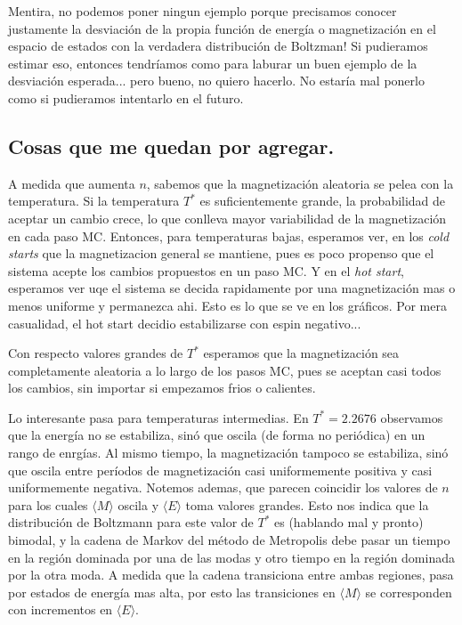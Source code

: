 \documentclass[a4paper,12pt]{article}
\begin{document}
Mentira, no podemos poner ningun ejemplo porque precisamos conocer justamente la desviación de la propia función de energía o magnetización en el espacio de estados con la verdadera distribución de Boltzman! Si pudieramos estimar eso, entonces tendríamos como para laburar un buen ejemplo de la desviación esperada... pero bueno, no quiero hacerlo. No estaría mal ponerlo como si pudieramos intentarlo en el futuro.

\subsection{Cosas que me quedan por agregar.}

A medida que aumenta $n$, sabemos que la magnetización aleatoria se pelea con la temperatura. Si la temperatura $T^*$ es suficientemente grande, la probabilidad de aceptar un cambio crece, lo que conlleva mayor variabilidad de la magnetización en cada paso MC. Entonces, para temperaturas bajas, esperamos ver, en los {\it cold starts} que la magnetizacion general se mantiene, pues es poco propenso que el sistema acepte los cambios propuestos en un paso MC. Y en el {\it hot start}, esperamos ver uqe el sistema se decida rapidamente por una magnetización mas o menos uniforme y permanezca ahi. Esto es lo que se ve en los gráficos. Por mera casualidad, el hot start decidio estabilizarse con espin negativo...

Con respecto valores grandes de $T^*$ esperamos que la magnetización sea completamente aleatoria a lo largo de los pasos MC, pues se aceptan casi todos los cambios, sin importar si empezamos frios o calientes.

Lo interesante pasa para temperaturas intermedias. En $T^* = 2.2676$ observamos que la energía no se estabiliza, sinó que oscila (de forma no periódica) en un rango de enrgías. Al mismo tiempo, la magnetización tampoco se estabiliza, sinó que oscila entre períodos de magnetización casi uniformemente positiva y casi uniformemente negativa. Notemos ademas, que parecen coincidir los valores de $n$ para los cuales $\langle M \rangle$ oscila y $\langle E \rangle$ toma valores grandes. Esto nos indica que la distribución de Boltzmann para este valor de $T^*$ es (hablando mal y pronto) bimodal, y la cadena de Markov del método de Metropolis debe pasar un tiempo en la región dominada por una de las modas y otro tiempo en la región dominada por la otra moda. A medida que la cadena transiciona entre ambas regiones, pasa por estados de energía mas alta, por esto las transiciones en $\langle M \rangle$ se corresponden con incrementos en $\langle E \rangle$.
\end{document}
